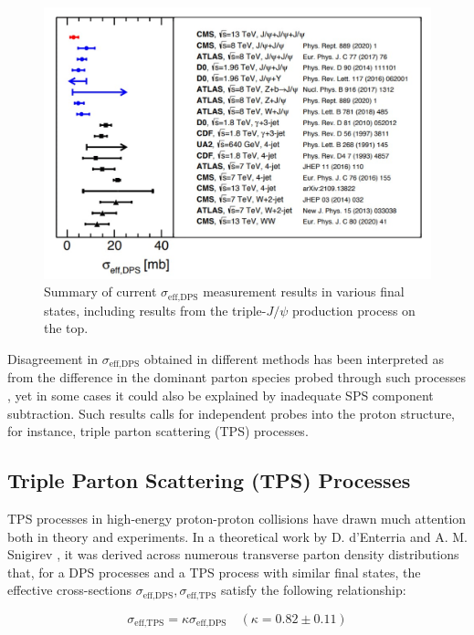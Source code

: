 \documentclass[10pt,twocolumn]{article}
\newcommand*{\effXsecDPS}{\sigma_{\text{eff,DPS}}}
\newcommand*{\effXsecTPS}{\sigma_{\text{eff,TPS}}}
\begin{document}
\begin{figure}
    \centering
    \includegraphics[width=1.0\linewidth]{images/sigma_eff_DPS_summary.png}
    \caption{Summary of current $\effXsecDPS$ measurement results in various final states, including results from the triple-$J/\psi$ production process on the top.\cite{CMS_TRI_JPSI}}
    \label{fig:sigma-eff-dps-summary}
\end{figure}

Disagreement in $\effXsecDPS$ obtained in different methods has been interpreted as from the difference in the dominant parton species probed through such processes \cite{MPI_LHC}, yet in some cases it could also be explained by inadequate SPS component subtraction. Such results calls for independent probes into the proton structure, for instance, triple parton scattering (TPS) processes.

\subsection{Triple Parton Scattering (TPS) Processes}

TPS processes in high-energy proton-proton collisions have drawn much attention both in theory and experiments. In a theoretical work by D. d'Enterria and A. M. Snigirev \cite{DdE_TPS}, it was derived across numerous transverse parton density distributions that, for a DPS processes and a TPS process with similar final states, the effective cross-sections $\effXsecDPS, \effXsecTPS$ satisfy the following relationship:

\begin{equation}
    \label{eqn:dps_tps_eff_xsec}
    \effXsecTPS = \kappa \effXsecDPS \quad (\kappa = 0.82 \pm  0.11)
\end{equation}
\end{document}
